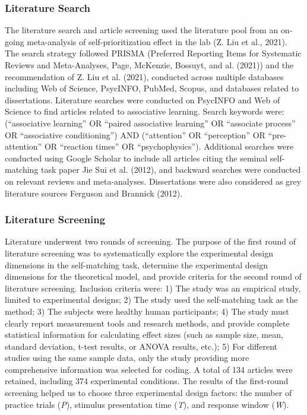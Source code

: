 \documentclass[
  english,
  man,floatsintext]{apa6}
\begin{document}
\subsubsection{Literature Search}\label{literature-search}

The literature search and article screening used the literature pool from an on-going meta-analysis of self-prioritization effect in the lab (Z. Liu et al., 2021). The search strategy followed PRISMA (Preferred Reporting Items for Systematic Reviews and Meta-Analyses, Page, McKenzie, Bossuyt, and al. (2021)) and the recommendation of Z. Liu et al. (2021), conducted across multiple databases including Web of Science, PsycINFO, PubMed, Scopus, and databases related to dissertations. Literature searches were conducted on PsycINFO and Web of Science to find articles related to associative learning. Search keywords were: (``associative learning'' OR ``paired associative learning'' OR ``associate process'' OR ``associative conditioning'') AND (``attention'' OR ``perception'' OR ``pre-attention'' OR ``reaction times'' OR ``psychophysics''). Additional searches were conducted using Google Scholar to include all articles citing the seminal self-matching task paper Jie Sui et al. (2012), and backward searches were conducted on relevant reviews and meta-analyses. Dissertations were also considered as grey literature sources Ferguson and Brannick (2012).

\subsubsection{Literature Screening}\label{literature-screening}

Literature underwent two rounds of screening. The purpose of the first round of literature screening was to systematically explore the experimental design dimensions in the self-matching task, determine the experimental design dimensions for the theoretical model, and provide criteria for the second round of literature screening. Inclusion criteria were: 1) The study was an empirical study, limited to experimental designs; 2) The study used the self-matching task as the method; 3) The subjects were healthy human participants; 4) The study must clearly report measurement tools and research methods, and provide complete statistical information for calculating effect sizes (such as sample size, mean, standard deviation, t-test results, or ANOVA results, etc.); 5) For different studies using the same sample data, only the study providing more comprehensive information was selected for coding. A total of 134 articles were retained, including 374 experimental conditions. The results of the first-round screening helped us to choose three experimental design factors: the number of practice trials (\emph{P}), stimulus presentation time (\emph{T}), and response window (\emph{W}).
\end{document}
